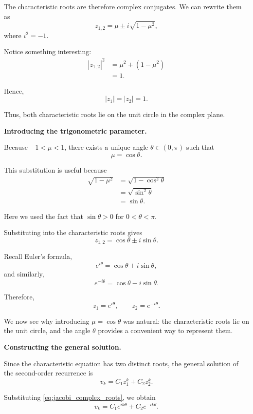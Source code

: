 \documentclass[11pt,a4paper]{article}
\theoremstyle{definition}
\theoremstyle{remark}
\begin{document}
The characteristic roots are therefore
complex conjugates. We can rewrite them as
\[
    z_{1,2}
    =
    \mu\pm i\sqrt{1-\mu^2},
\]
where $i^2=-1$.

Notice something interesting:
\[
\begin{aligned}
    |z_{1,2}|^2
    &=
    \mu^2+(1-\mu^2)\\
    &=1.
\end{aligned}
\]

Hence,
\[
    \boxed{|z_1|=|z_2|=1.}
\]

Thus, both characteristic roots lie on
the unit circle in the complex plane.

\medskip
\noindent
\textbf{Introducing the trigonometric parameter.}

Because $-1<\mu<1$, there exists
a unique angle $\theta\in(0,\pi)$
such that
\[
    \boxed{\mu=\cos\theta.}
\]

This substitution is useful because
\[
\begin{aligned}
    \sqrt{1-\mu^2}
    &=
    \sqrt{1-\cos^2\theta}\\
    &=
    \sqrt{\sin^2\theta}\\
    &=\sin\theta.
\end{aligned}
\]

Here we used the fact that
$\sin\theta>0$ for $0<\theta<\pi$.

Substituting into the characteristic
roots gives
\[
    z_{1,2}
    =
    \cos\theta\pm i\sin\theta.
\]

Recall Euler's formula,
\[
    e^{i\theta}
    =
    \cos\theta+i\sin\theta,
\]
and similarly,
\[
    e^{-i\theta}
    =
    \cos\theta-i\sin\theta.
\]

Therefore,
\begin{equation}
    \boxed{
    z_1=e^{i\theta},
    \qquad
    z_2=e^{-i\theta}.
    }
    \label{eq:jacobi_complex_roots}
\end{equation}

We now see why introducing
$\mu=\cos\theta$ was natural:
the characteristic roots lie on
the unit circle, and the angle
$\theta$ provides a convenient
way to represent them.

\medskip
\noindent
\textbf{Constructing the general solution.}

Since the characteristic equation has
two distinct roots, the general
solution of the second-order recurrence
is
\[
    v_k=C_1z_1^k+C_2z_2^k.
\]

Substituting
\eqref{eq:jacobi_complex_roots},
we obtain
\[
    v_k=
    C_1e^{ik\theta}
    +
    C_2e^{-ik\theta}.
\]
\end{document}
